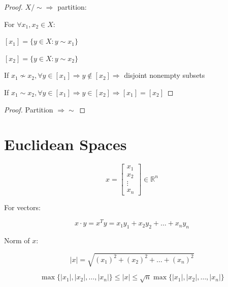 \documentclass{blog}
\begin{document}
\begin{proof}
    $X/\sim \Rightarrow$ partition:

    For $\forall x_{1}, x_{2} \in X:$

    $[x_{1}]=\{y \in X: y \sim x_{1}\}$

    $[x_{2}]=\{y \in X: y \sim x_{2}\}$


    If $x_{1} \nsim x_{2}, \forall y \in [x_{1}] \Rightarrow y \notin [x_{2}] \Rightarrow$ disjoint nonempty subsets

    If $x_{1} \sim x_{2}, \forall y \in [x_{1}] \Rightarrow y \in [x_{2}] \Rightarrow [x_{1}] = [x_{2}]$
\end{proof}

\begin{proof}
    Partition $\Rightarrow \sim$
\end{proof}

\section{Euclidean Spaces}

\begin{equation*}
    x =
    \begin{bmatrix}
        x_{1}  \\
        x_{2}  \\
        \vdots \\
        x_{n}
    \end{bmatrix}
    \in \mathbb{R}^{n}
\end{equation*}

\begin{definition}
    For vectors:

    \begin{equation*}
        x \cdot y = x^{T}y = x_{1}y_{1} + x_{2}y_{2} + \dots + x_{n}y_{n}
    \end{equation*}
\end{definition}

\begin{definition}
    Norm of $x$:

    \begin{equation*}
        |x| = \sqrt{(x_{1})^2 + (x_{2})^2 + \dots + (x_{n})^2}
    \end{equation*}
\end{definition}

\begin{example}
    \begin{equation*}
        \max \{|x_{1}|,|x_{2}|,\dots,|x_{n}|\} \leq |x| \leq \sqrt{n} \max \{|x_{1}|,|x_{2}|,\dots,|x_{n}|\}
    \end{equation*}
\end{example}
\end{document}
